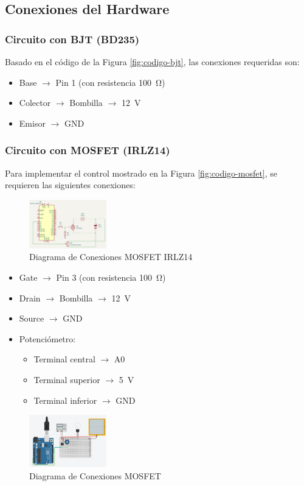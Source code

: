 \subsection{Conexiones del Hardware}
\subsubsection{Circuito con BJT (BD235)}
Basado en el c\'odigo de la Figura \ref{fig:codigo-bjt}, las conexiones requeridas son:
\begin{itemize}
	\item Base $\rightarrow$ Pin 1 (con resistencia \SI{100}{\ohm})
	\item Colector $\rightarrow$ Bombilla $\rightarrow$ \SI{12}{\volt}
	\item Emisor $\rightarrow$ GND
\end{itemize}

\subsubsection{Circuito con MOSFET (IRLZ14)}
Para implementar el control mostrado en la Figura \ref{fig:codigo-mosfet}, se requieren las siguientes conexiones:
\begin{figure}[H]
	\centering
	\includegraphics[width=0.3\textwidth]{images/esquematico2}
	\caption{Diagrama de Conexiones MOSFET IRLZ14}
	\label{fig:diagramaMOSFET}
\end{figure}
\begin{itemize}
	\item Gate $\rightarrow$ Pin 3 (con resistencia \SI{100}{\ohm})
	\item Drain $\rightarrow$ Bombilla $\rightarrow$ \SI{12}{\volt}
	\item Source $\rightarrow$ GND
	\item Potenci\'ometro:
	\begin{itemize}
		\item Terminal central $\rightarrow$ A0
		\item Terminal superior $\rightarrow$ \SI{5}{\volt}
		\item Terminal inferior $\rightarrow$ GND
	\end{itemize}
\end{itemize}
\begin{figure}[H]
	\centering
	\includegraphics[width=0.3\textwidth]{images/conexion2}
	\caption{Diagrama de Conexiones MOSFET}
	\label{fig:conexionesmosfet}
\end{figure}

